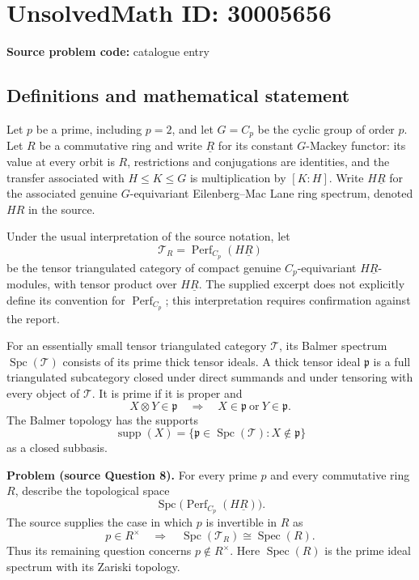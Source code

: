 \documentclass[11pt]{article}
\begin{document}
\section*{UnsolvedMath ID: 30005656}
\textbf{Source problem code:} catalogue entry
\subsection{Definitions and mathematical statement}
Let \(p\) be a prime, including \(p=2\), and let \(G=C_p\) be the cyclic group of order \(p\). Let \(R\) be a commutative ring and write \(\underline R\) for its constant \(G\)-Mackey functor: its value at every orbit is \(R\), restrictions and conjugations are identities, and the transfer associated with \(H\leq K\leq G\) is multiplication by \([K:H]\). Write \(H\underline R\) for the associated genuine \(G\)-equivariant Eilenberg--Mac Lane ring spectrum, denoted \(HR\) in the source.

Under the usual interpretation of the source notation, let
\[
\mathcal T_R=\operatorname{Perf}_{C_p}(H\underline R)
\]
be the tensor triangulated category of compact genuine \(C_p\)-equivariant \(H\underline R\)-modules, with tensor product over \(H\underline R\). The supplied excerpt does not explicitly define its convention for \(\operatorname{Perf}_{C_p}\); this interpretation requires confirmation against the report.

For an essentially small tensor triangulated category \(\mathcal T\), its Balmer spectrum \(\operatorname{Spc}(\mathcal T)\) consists of its prime thick tensor ideals. A thick tensor ideal \(\mathfrak p\) is a full triangulated subcategory closed under direct summands and under tensoring with every object of \(\mathcal T\). It is prime if it is proper and
\[
X\otimes Y\in\mathfrak p\quad\Longrightarrow\quad X\in\mathfrak p\ \text{or}\ Y\in\mathfrak p.
\]
The Balmer topology has the supports
\[
\operatorname{supp}(X)=\{\mathfrak p\in\operatorname{Spc}(\mathcal T):X\notin\mathfrak p\}
\]
as a closed subbasis.

\textbf{Problem (source Question 8).} For every prime \(p\) and every commutative ring \(R\), describe the topological space
\[
\operatorname{Spc}\bigl(\operatorname{Perf}_{C_p}(H\underline R)\bigr).
\]
The source supplies the case in which \(p\) is invertible in \(R\) as
\[
p\in R^\times\quad\Longrightarrow\quad
\operatorname{Spc}(\mathcal T_R)\cong\operatorname{Spec}(R).
\]
Thus its remaining question concerns \(p\notin R^\times\). Here \(\operatorname{Spec}(R)\) is the prime ideal spectrum with its Zariski topology.
\end{document}
